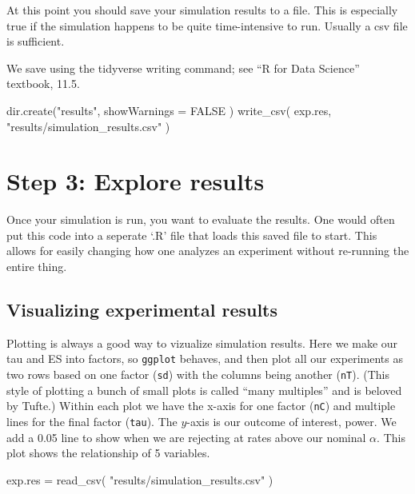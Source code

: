 \documentclass[
]{book}
\newenvironment{Shaded}{\begin{snugshade}}{\end{snugshade}}
\newcommand{\AttributeTok}[1]{\textcolor[rgb]{0.77,0.63,0.00}{#1}}
\newcommand{\ConstantTok}[1]{\textcolor[rgb]{0.00,0.00,0.00}{#1}}
\newcommand{\FunctionTok}[1]{\textcolor[rgb]{0.00,0.00,0.00}{#1}}
\newcommand{\NormalTok}[1]{#1}
\newcommand{\OtherTok}[1]{\textcolor[rgb]{0.56,0.35,0.01}{#1}}
\newcommand{\StringTok}[1]{\textcolor[rgb]{0.31,0.60,0.02}{#1}}
\begin{document}
At this point you should save your simulation results to a file. This is
especially true if the simulation happens to be quite time-intensive to run.
Usually a csv file is sufficient.

We save using the tidyverse writing command; see ``R for Data Science''
textbook, 11.5.

\begin{Shaded}
\begin{Highlighting}[]
\FunctionTok{dir.create}\NormalTok{(}\StringTok{"results"}\NormalTok{, }\AttributeTok{showWarnings =} \ConstantTok{FALSE}\NormalTok{ )}
\FunctionTok{write\_csv}\NormalTok{( exp.res, }\StringTok{"results/simulation\_results.csv"}\NormalTok{ )}
\end{Highlighting}
\end{Shaded}

\hypertarget{step-3-explore-results}{%
\section{Step 3: Explore results}\label{step-3-explore-results}}

Once your simulation is run, you want to evaluate the results. One would
often put this code into a seperate `.R' file that loads this saved file to
start. This allows for easily changing how one analyzes an experiment
without re-running the entire thing.

\hypertarget{visualizing-experimental-results}{%
\subsection{Visualizing experimental results}\label{visualizing-experimental-results}}

Plotting is always a good way to vizualize simulation results. Here we make
our tau and ES into factors, so \texttt{ggplot} behaves, and then plot all our
experiments as two rows based on one factor (\texttt{sd}) with the columns being
another (\texttt{nT}). (This style of plotting a bunch of small plots is called
``many multiples'' and is beloved by Tufte.) Within each plot we have the
x-axis for one factor (\texttt{nC}) and multiple lines for the final factor (\texttt{tau}).
The \(y\)-axis is our outcome of interest, power. We add a 0.05 line to show
when we are rejecting at rates above our nominal \(\alpha\). This plot shows
the relationship of 5 variables.

\begin{Shaded}
\begin{Highlighting}[]
\NormalTok{exp.res }\OtherTok{=} \FunctionTok{read\_csv}\NormalTok{( }\StringTok{"results/simulation\_results.csv"}\NormalTok{ )}
\end{Highlighting}
\end{Shaded}
\end{document}
